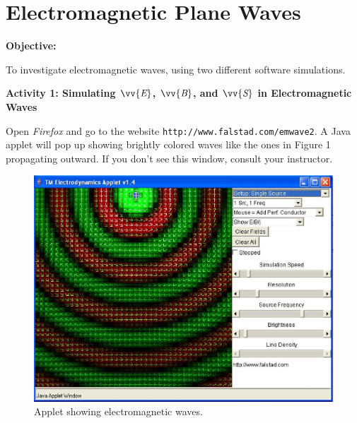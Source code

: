 \setcounter{equation}{0}
\setcounter{figure}{0}

\section{Electromagnetic Plane Waves}

\makelabheader %

\bigskip
\textbf{Objective:} 


To investigate electromagnetic waves, using two different software simulations.


\bigskip

\textbf{Activity 1: Simulating $\vv{\textit{E}}$, $\vv{\textit{B}}$, and $\vv{\textit{S}}$ in Electromagnetic Waves}


Open \textit{Firefox} and go to the website
\verb!http://www.falstad.com/emwave2!. A Java applet will pop up showing
brightly colored waves like the ones in Figure 1 propagating outward. 
If you don't see this window, consult your instructor.
\begin{figure}[hbt]
\begin{center}
\includegraphics[width=6.0in]{plane_waves/emwaves1.eps}
\caption{Applet showing electromagnetic waves.}
\end{center}
\end{figure}

